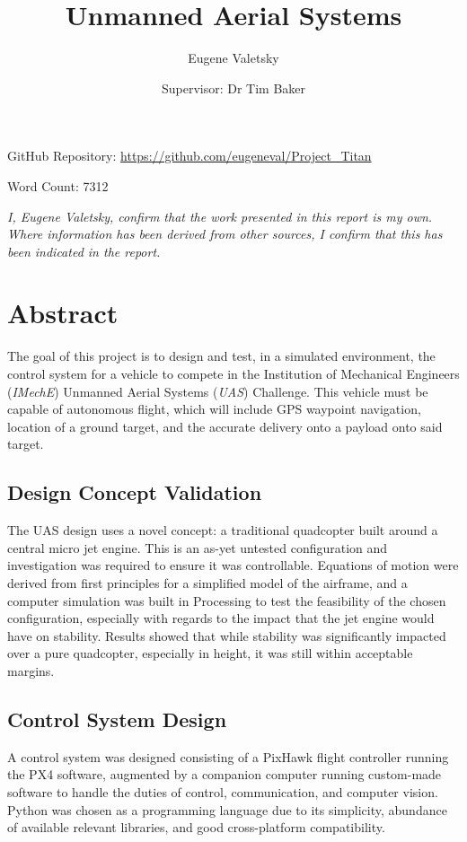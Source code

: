 \documentclass[11pt]{article}
\author{Eugene Valetsky\\ \and Supervisor: Dr Tim Baker}
\title{Unmanned Aerial Systems}
\begin{document}
\maketitle

\begin{center}
    GitHub Repository: \url{https://github.com/eugeneval/Project_Titan}

    \vspace{2em}
    Word Count: 7312


    \vspace{6em}
    \emph{I, Eugene Valetsky, confirm that the work presented in this report is my own. Where information has been derived from other sources, I confirm that this has been indicated in the report.}
\end{center}

\newpage
\tableofcontents
\listoffigures
\newpage



\section{Abstract}
The goal of this project is to design and test, in a simulated environment, the control system for a vehicle to compete in the Institution of Mechanical Engineers (\emph{IMechE}) Unmanned Aerial Systems (\emph{UAS}) Challenge. This vehicle must be capable of autonomous flight, which will include GPS waypoint navigation, location of a ground target, and the accurate delivery onto a payload onto said target\cite{IMechE_rules}.

\subsection*{Design Concept Validation}
The UAS design uses a novel concept: a traditional quadcopter built around a central micro jet engine\cite{Ismail_paper}. This is an as-yet untested configuration and investigation was required to ensure it was controllable. Equations of motion were derived from first principles for a simplified model of the airframe, and a computer simulation was built in Processing\cite{processing} to test the feasibility of the chosen configuration, especially with regards to the impact that the jet engine would have on stability. Results showed that while stability was significantly impacted over a pure quadcopter, especially in height, it was still within acceptable margins.

\subsection*{Control System Design}
A control system was designed consisting of a PixHawk flight controller running the PX4 software\cite{PX4_user_guide}, augmented by a companion computer running custom-made software to handle the duties of control, communication, and computer vision. Python\cite{python} was chosen as a programming language due to its simplicity, abundance of available relevant libraries, and good cross-platform compatibility.
\end{document}
